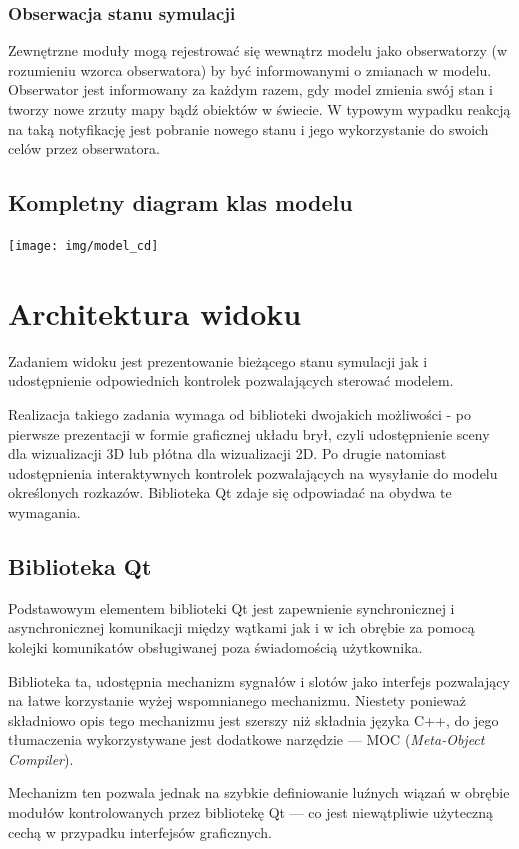 {{{\subsubsection{Obserwacja stanu symulacji}
\par{
Zewnętrzne moduły mogą rejestrować się wewnątrz modelu jako obserwatorzy (w rozumieniu wzorca obserwatora) by być informowanymi o zmianach w modelu. Obserwator jest informowany za każdym razem, gdy model zmienia swój stan i tworzy nowe zrzuty mapy bądź obiektów w świecie. W typowym wypadku reakcją na taką notyfikację jest pobranie nowego stanu i jego wykorzystanie do swoich celów przez obserwatora.
}
\subsection{Kompletny diagram klas modelu}
\par{
\begin{center}
\texttt{[image: img/model\_cd]}
\end{center}
}

\section[Architektura widoku][Architektura widoku]{Architektura widoku}
\par{
Zadaniem widoku jest prezentowanie bieżącego stanu symulacji jak i udostępnienie odpowiednich kontrolek pozwalających sterować modelem.
}
\par{
Realizacja takiego zadania wymaga od biblioteki dwojakich możliwości - po pierwsze prezentacji w formie graficznej układu brył, czyli udostępnienie sceny dla wizualizacji 3D lub płótna dla wizualizacji 2D. Po drugie natomiast udostępnienia interaktywnych kontrolek pozwalających na wysyłanie do modelu określonych rozkazów. Biblioteka Qt zdaje się odpowiadać na obydwa te wymagania.
}
\subsection{Biblioteka Qt}
\par{
Podstawowym elementem biblioteki Qt jest zapewnienie synchronicznej i asynchronicznej komunikacji między wątkami jak i w ich obrębie za pomocą kolejki komunikatów obsługiwanej poza świadomością użytkownika.
}
\par{
Biblioteka ta, udostępnia mechanizm sygnałów i slotów jako interfejs pozwalający na łatwe korzystanie wyżej wspomnianego mechanizmu. Niestety ponieważ składniowo opis tego mechanizmu jest szerszy niż składnia języka C++, do jego tłumaczenia wykorzystywane jest dodatkowe narzędzie --- MOC (\textit{Meta-Object Compiler}).
}
\par{
Mechanizm ten pozwala jednak na szybkie definiowanie luźnych wiązań w obrębie modułów kontrolowanych przez bibliotekę Qt --- co jest niewątpliwie użyteczną cechą w przypadku interfejsów graficznych.
}
}}}
